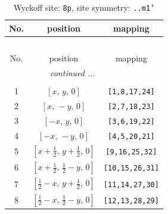 \documentclass[fleqn,8pt]{jsarticle}
\begin{document}
\begin{longtable}{ccc}
\caption{Wyckoff site: {\tt 8p}, site symmetry: {\tt ..m1'}}
 \\
 \hline \hline
No. & position & mapping \\ \hline \endfirsthead

\multicolumn{2}{l}{\tablename\ \thetable{}} \\
 \hline \hline
No. & position & mapping \\ \hline \endhead

 \hline \hline
\multicolumn{2}{r}{\footnotesize\it continued ...} \\ \endfoot

 \hline \hline
\multicolumn{2}{r}{} \\ \endlastfoot

1 & $\left[ x,\, y,\, 0 \right]$ & {\tt [1,8,17,24]} \\ \hline
2 & $\left[ x,\, - y,\, 0 \right]$ & {\tt [2,7,18,23]} \\ \hline
3 & $\left[ - x,\, y,\, 0 \right]$ & {\tt [3,6,19,22]} \\ \hline
4 & $\left[ - x,\, - y,\, 0 \right]$ & {\tt [4,5,20,21]} \\ \hline
5 & $\left[ x + \frac{1}{2},\, y + \frac{1}{2},\, 0 \right]$ & {\tt [9,16,25,32]} \\ \hline
6 & $\left[ x + \frac{1}{2},\, \frac{1}{2} - y,\, 0 \right]$ & {\tt [10,15,26,31]} \\ \hline
7 & $\left[ \frac{1}{2} - x,\, y + \frac{1}{2},\, 0 \right]$ & {\tt [11,14,27,30]} \\ \hline
8 & $\left[ \frac{1}{2} - x,\, \frac{1}{2} - y,\, 0 \right]$ & {\tt [12,13,28,29]} \\
\end{longtable}
\renewcommand{\arraystretch}{1.2}
\end{document}
